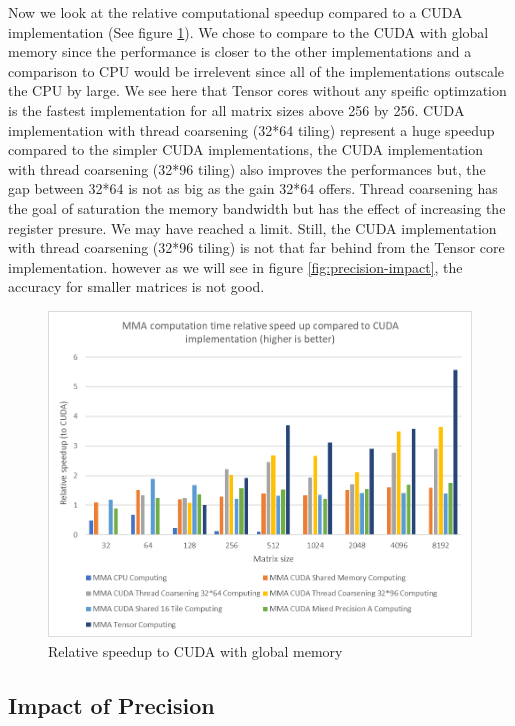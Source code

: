 \documentclass[conference]{IEEEtran}
\begin{document}
  Now we look at the relative computational speedup compared to a CUDA implementation (See figure \ref{fig:performance-comparison}).
  We chose to compare to the CUDA with global memory since the performance is closer to 
  the other implementations and a comparison to CPU would be irrelevent since all of the implementations
  outscale the CPU by large. We see here that Tensor cores without any speific optimzation is the fastest
  implementation for all matrix sizes above 256 by 256. CUDA implementation with thread coarsening (32*64 tiling) represent a huge
  speedup compared to the simpler CUDA implementations, the CUDA implementation with thread coarsening (32*96 tiling) also improves
  the performances but, the gap between 32*64 is not as big as the gain 32*64 offers. Thread coarsening has the goal
  of saturation the memory bandwidth but has the effect of increasing the register presure. We may have reached a limit.
  Still, the CUDA implementation with thread coarsening (32*96 tiling) is not that far behind from the Tensor core implementation.
  however as we will see in figure \ref{fig:precision-impact}, the accuracy for smaller matrices is not good.

  \begin{figure}[h]
    \centering
    \includegraphics[scale=0.53]{figures/relative_speedup_2.png}
    \caption{Relative speedup to CUDA with global memory}
    \label{fig:performance-comparison}
  \end{figure}
  
  
  
  \subsection{Impact of Precision}\label{sec:impact-precision}
  
\end{document}
